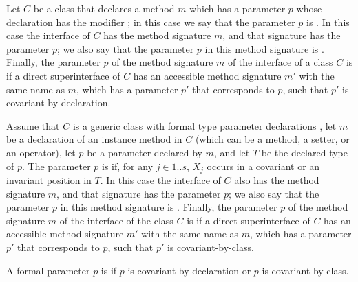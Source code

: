 \documentclass[makeidx]{article}
\begin{document}
\LMHash{}%
%
Let $C$ be a class that declares
a method $m$ which has
a parameter $p$ whose declaration has the modifier \COVARIANT;
in this case we say that the parameter $p$ is
.
%
In this case the interface of $C$ has the method signature $m$,
and that signature has the parameter $p$;
we also say that the parameter $p$ in this method signature is
.
%
Finally, the parameter $p$ of the method signature $m$
of the interface of a class $C$ is
if a direct superinterface of $C$
has an accessible method signature $m'$ with the same name as $m$,
which has a parameter $p'$ that corresponds to $p$,
such that $p'$ is covariant-by-declaration.

\LMHash{}%
Assume that $C$ is a generic class
with formal type parameter declarations
,
%
let $m$ be a declaration of an instance method in $C$
(which can be a method, a setter, or an operator),
let $p$ be a parameter declared by $m$, and
let $T$ be the declared type of $p$.
%
The parameter $p$ is
if, for any $j \in 1 .. s$,
$X_j$ occurs in a covariant or an invariant position in $T$.
%
In this case the interface of $C$ also has the method signature $m$,
and that signature has the parameter $p$;
we also say that the parameter $p$ in this method signature is
.
Finally, the parameter $p$ of the method signature $m$
of the interface of the class $C$ is
if a direct superinterface of $C$
has an accessible method signature $m'$ with the same name as $m$,
which has a parameter $p'$ that corresponds to $p$,
such that $p'$ is covariant-by-class.

\LMHash{}%
A formal parameter $p$ is
if $p$ is covariant-by-declaration or $p$ is covariant-by-class.

\end{document}
